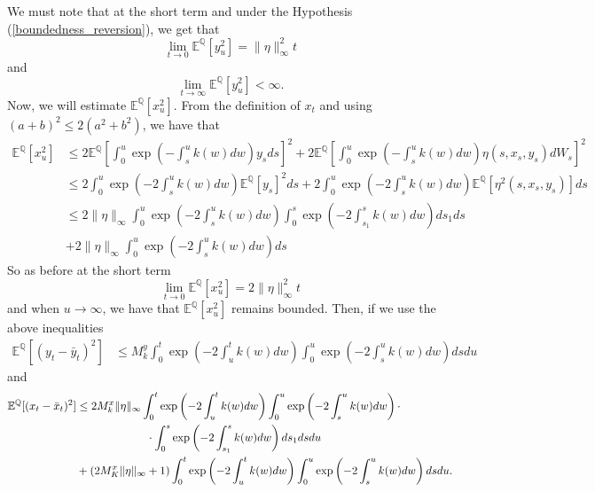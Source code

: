 \documentclass[a4paper,10pt]{article}
\newcommand{\1}{\mathbf{1}}
\begin{document}
We must note that at the short term and under the Hypothesis (\ref{boundedness_reversion}), we get that
\begin{equation*}
\lim_{t \to 0} \mathbb{E}^{\mathbb{Q}}[y^{2}_u] = \|\eta\|^{2}_{\infty} t
\end{equation*}
and 
\begin{equation*}
\lim_{t \to \infty} \mathbb{E}^{\mathbb{Q}}[y^{2}_u] < \infty.
\end{equation*}
Now, we will estimate $\mathbb{E}^{\mathbb{Q}}[x^{2}_u]$. From the definition of $x_t$ and using $(a+b)^2 \leq 2(a^{2}+ b^{2})$, we have that
\begin{align*}
\mathbb{E}^{\mathbb{Q}}[x^{2}_u] &\leq 2 \mathbb{E}^{\mathbb{Q}}\left[\int_{0}^{u} \exp\left(- \int_{s}^{u} k(w) dw\right) y_s  ds \right]^{2} +  2 \mathbb{E}^{\mathbb{Q}}\left[\int_{0}^{u} \exp\left(- \int_{s}^{u} k(w) dw\right) \eta(s,x_s,y_s)  dW_s \right]^{2} \nonumber \\
&\leq 2 \int_{0}^{u} \exp\left(- 2\int_{s}^{u} k(w) dw\right) \mathbb{E}^{\mathbb{Q}}\left[y_s\right]^{2} ds + 2 \int_{0}^{u} \exp\left(- 2 \int_{s}^{u} k(w) dw\right) \mathbb{E}^{\mathbb{Q}}\left[\eta^{2}(s,x_s,y_s)\right] ds \\
&\leq 2 \|\eta\|_{\infty} \int_{0}^{u} \exp\left(- 2\int_{s}^{u} k(w) dw\right) \int_{0}^{s}  \exp\left(- 2\int_{s_1}^{s} k(w) dw\right) ds_1 ds\\
&+  2 \|\eta\|_{\infty} \int_{0}^{u} \exp\left(- 2\int_{s}^{u} k(w) dw\right) ds
\end{align*}
So as before at the short term
$$
\lim_{t \to 0} \mathbb{E}^{\mathbb{Q}}[x^{2}_u] = 2\|\eta\|^{2}_{\infty} t
$$
and when $u \to \infty$, we have that $\mathbb{E}^{\mathbb{Q}}[x^{2}_u]$ remains bounded. Then, if we use the above inequalities 
\begin{align*}
\mathbb{E}^{\mathbb{Q}}[(y_t - \bar{y}_t)^{2}] &\leq M^{y}_k \int_{0}^{t}  \exp\left(- 2\int_{u}^{t} k(w) dw\right)  \int_{0}^{u} \exp\left(- 2\int_{s}^{u} k(w) dw\right) ds du
\end{align*}
and
\begin{align*}
\mathbb{E}^{\mathbb{Q}}[(x_t - \bar{x}_t)^{2}] &\leq 2 M^{x}_k \|\eta\|_{\infty} \int_{0}^{t} \exp\left(- 2\int_{u}^{t} k(w) dw\right)\int_{0}^{u} \exp\left(- 2\int_{s}^{u} k(w) dw\right) \cdot \\
& \qquad \hspace{1.5cm} \cdot \int_{0}^{s}  \exp\left(- 2\int_{s_1}^{s} k(w) dw\right) ds_1 ds du \\
&+ (2 M^{x}_K \|\eta\|_{\infty} + 1) \int_{0}^{t}  \exp\left(- 2\int_{u}^{t} k(w) dw\right)  \int_{0}^{u} \exp\left(- 2\int_{s}^{u} k(w) dw\right) ds du.
\end{align*}
\end{document}
